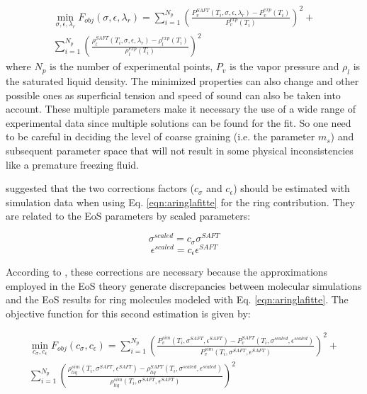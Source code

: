 \begin{equation}
\begin{aligned}
\min\limits_{\sigma,\epsilon,\lambda_{r}} F_{obj}(\sigma,\epsilon,\lambda_{r})= \sum_{i=1}^{N_{p}} \left(\frac{P_{v}^{SAFT}(T_{i},\sigma,\epsilon,\lambda_{r})-P_{v}^{exp}(T_{i})}{P_{v}^{exp}(T_{i})} \right)^2 +\\
 \sum_{i=1}^{N_{p}} \left(\frac{\rho_{l}^{SAFT}(T_{i},\sigma,\epsilon,\lambda_{r})-\rho_{l}^{exp}(T_{i})}{\rho_{l}^{exp}(T_{i})} \right)^2
\end{aligned}
\label{eqn:fobj}
\end{equation}
where $N_{p}$ is the number of experimental points, $P_{v}$ is the vapor pressure and $\rho_{l}$ is the saturated liquid density. The minimized properties can also change and other possible ones as superficial tension and speed of sound can also be taken into account. These multiple parameters make it necessary the use of a wide range of experimental data since multiple solutions can be found for the fit. So one need to be careful in deciding the level of coarse graining (i.e. the parameter $m_{s}$) and subsequent parameter space that will not result in some physical inconsistencies like a premature freezing fluid.

 suggested that the two corrections factors ($c_{\sigma}$ and $c_{\epsilon}$) should be estimated with simulation data when using Eq. \eqref{eqn:aringlafitte} for the ring contribution. They are related to the EoS parameters by scaled parameters:

\begin{equation}
\sigma^{scaled} = c_{\sigma}\sigma^{SAFT}
\label{eqn:csigma}
\end{equation}
\begin{equation}
\epsilon^{scaled} = c_{\epsilon}\epsilon^{SAFT}
\label{eqn:ceps}
\end{equation}

According to , these corrections are necessary because the approximations employed in the EoS theory generate discrepancies between molecular simulations and the EoS results for ring molecules modeled with Eq. \eqref{eqn:aringlafitte}. The objective function for this second estimation is given by:

\begin{equation}
\begin{split}
\min\limits_{c_{\sigma},c_{\epsilon}} F_{obj}(c_{\sigma},c_{\epsilon})= \sum_{i=1}^{N_{p}} \left(\frac{P_{v}^{sim}(T_{i},\sigma^{SAFT},\epsilon^{SAFT})-P_{v}^{SAFT}(T_{i},\sigma^{scaled},\epsilon^{scaled})}{P_{v}^{sim}(T_{i},\sigma^{SAFT},\epsilon^{SAFT})} \right)^2 + \\
 \sum_{i=1}^{N_{p}} \left(\frac{\rho_{liq}^{sim}(T_{i},\sigma^{SAFT},\epsilon^{SAFT})-\rho_{liq}^{SAFT}(T_{i},\sigma^{scaled},\epsilon^{scaled})}{\rho_{liq}^{sim}(T_{i},\sigma^{SAFT},\epsilon^{SAFT})} \right)^2
\end{split}
\label{eqn:fobjla}
\end{equation}

